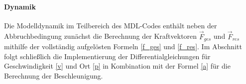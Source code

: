 \paragraph{Dynamik} Die Modelldynamik im Teilbereich  des MDL-Codes enthält neben der Abbruchbedingung zunächst die Berechnung der Kraftvektoren $\vec{F}_{ges}$ und $\vec{F}_{res}$ mithilfe der vollständig aufgelösten Formeln \eqref{f_ges} und \eqref{f_res}. Im Abschnitt  folgt schließlich die Implementierung der Differentialgleichungen für Geschwindigkeit \eqref{v} und Ort \eqref{p} in Kombination mit der Formel \eqref{a} für die Berechnung der Beschleunigung.